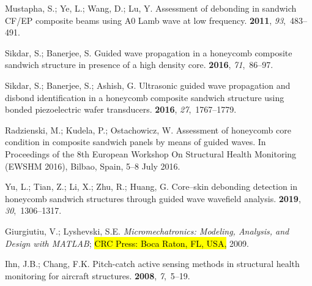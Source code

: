\documentclass[sensors,article,accept,moreauthors,pdftex]{Definitions/mdpi}
\begin{document}
\begin{thebibliography}{999}

Mustapha, S.; Ye, L.; Wang, D.; Lu, Y.
\newblock Assessment of debonding in sandwich CF/EP composite beams using A0
  Lamb wave at low frequency.
 {\bf 2011}, {\em 93},~483--491.

Sikdar, S.; Banerjee, S.
\newblock Guided wave propagation in a honeycomb composite sandwich structure
  in presence of a high density core.
 {\bf 2016}, {\em 71},~86--97.

Sikdar, S.; Banerjee, S.; Ashish, G.
\newblock Ultrasonic guided wave propagation and disbond identification in a
  honeycomb composite sandwich structure using bonded piezoelectric wafer
  transducers.
 {\bf 2016}, {\em 27},~1767--1779.

Radzienski, M.; Kudela, P.; Ostachowicz, W.
\newblock Assessment of honeycomb core condition in composite sandwich panels
  by means of guided waves.
\newblock  In Proceedings of the 8th European Workshop On Structural Health Monitoring
  (EWSHM 2016), Bilbao, Spain, {5--8 July} 2016. %


Yu, L.; Tian, Z.; Li, X.; Zhu, R.; Huang, G.
\newblock Core--skin debonding detection in honeycomb sandwich structures
  through guided wave wavefield analysis.
 {\bf 2019}, {\em 30},~1306--1317.

Giurgiutiu, V.; Lyshevski, S.E.
\newblock \emph{Micromechatronics: Modeling, Analysis, and Design with
  {MATLAB}{\textsuperscript{\textregistered}}}; \hl{CRC Press: Boca Raton, FL, USA,} %
 2009.

Ihn, J.B.; Chang, F.K.
\newblock Pitch-catch active sensing methods in structural health monitoring
  for aircraft structures.
 {\bf 2008}, {\em 7},~5--19.


\end{thebibliography}
\end{document}

